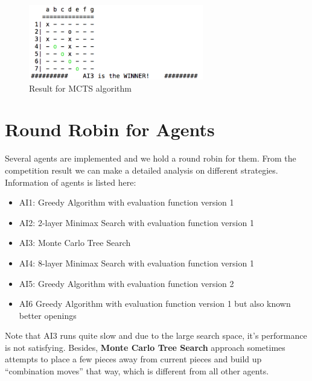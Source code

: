 \documentclass[12pt,a4paper]{article}
\begin{document}
\begin{figure}[H]
\centering\includegraphics[width=3in]{ai3.png}
\caption{Result for MCTS algorithm}
\end{figure}



\section{Round Robin for Agents}
Several agents are implemented and we hold a round robin for them. From the competition result we can make a detailed analysis on different strategies.\\
Information of agents is listed here:
\begin{itemize}
\item AI1: Greedy Algorithm with evaluation function version 1
\item AI2: 2-layer Minimax Search with evaluation function version 1
\item AI3: Monte Carlo Tree Search
\item AI4: 8-layer Minimax Search with evaluation function version 1
\item AI5: Greedy Algorithm with evaluation function version 2
\item AI6 Greedy Algorithm with evaluation function version 1 but also known better openings
\end{itemize}
Note that AI3 runs quite slow and due to the large search space, it's performance is not satisfying. Besides, \textbf{Monte Carlo Tree Search} approach sometimes attempts to place a few pieces away from current pieces and build up ``combination moves'' that way, which is different from all other agents.
\end{document}
